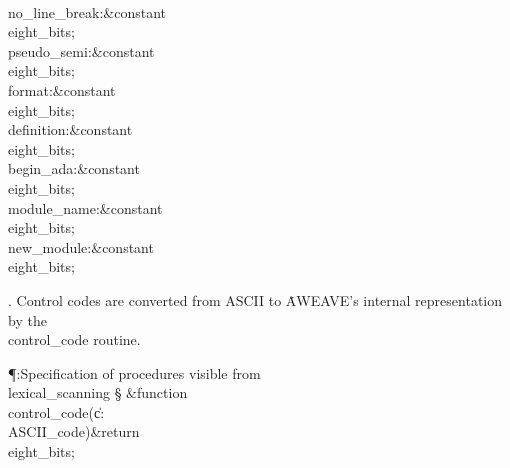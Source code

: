 \6
\\{no\_line\_break}\?:\?\&{constant}\8\\{eight\_bits}\?\K{}\?;%
\6
\\{pseudo\_semi}\?:\?\&{constant}\8\\{eight\_bits}\?\K{}\?;\6
\\{format}\?:\?\&{constant}\8\\{eight\_bits}\?\K{}\?;\6
\\{definition}\?:\?\&{constant}\8\\{eight\_bits}\?\K{}\?;\6
\\{begin\_ada}\?:\?\&{constant}\8\\{eight\_bits}\?\K{}\?;\6
\\{module\_name}\?:\?\&{constant}\8\\{eight\_bits}\?\K{}\?;\6
\\{new\_module}\?:\?\&{constant}\8\\{eight\_bits}\?\K{}\?;\par
\fi

. Control codes are converted from ASCII to \.{AWEAVE}'s internal
representation by the \\{control\_code} routine.

\Y\P\?\4:Specification of procedures visible from \\{lexical\_scanning}\X%
\mathrel{+}\S\?\6
\&{function}\8\1\\{control\_code}\?(\1\?\|c\?:\?\\{ASCII\_code}\?\2)\&{return}%
\?\8\\{eight\_bits}\2;\par
\fi

